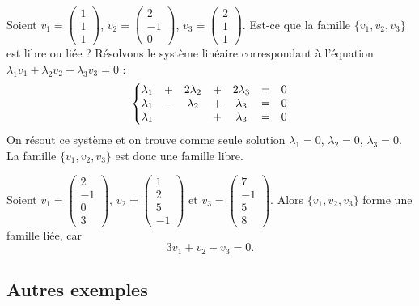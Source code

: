 \documentclass[class=report,crop=false]{standalone}
\begin{document}
\begin{exemple}
Soient
$v_1=\left(\begin{smallmatrix}  1\\1\\1 \end{smallmatrix}\right)$,
$v_2 = \left(\begin{smallmatrix} 2\\-1\\0 \end{smallmatrix}\right)$,
$v_3 = \left(\begin{smallmatrix} 2\\1\\1  \end{smallmatrix}\right)$.
Est-ce que la famille $\{v_1, v_2, v_3\}$ est libre ou liée ?
Résolvons le système linéaire correspondant à l'équation
$\lambda_1 v_1+ \lambda_2 v_2 + \lambda_3 v_3 = 0$ :
$$\left \{ \begin{matrix}
\lambda_1&+&2\lambda_2&+& 2\lambda_{3}&=&0 \cr
\lambda_1&-&\lambda_2&+&\lambda_{3}&=&0\cr
\lambda_1&&&+&\lambda_{3}&=&0\cr
\end{matrix}\right .$$
On résout ce système et on trouve comme seule solution
$\lambda_1=0$, $\lambda_2=0$, $\lambda_{3}=0$.
La famille $\{v_1, v_2, v_3\}$ est donc une famille libre.
\end{exemple}

\begin{exemple}
Soient $v_1=\left(\begin{smallmatrix}2\\ -1\\ 0\\3\end{smallmatrix}\right)$,
$v_2=\left(\begin{smallmatrix}1\\2\\5\\ -1\end{smallmatrix}\right)$ et
$v_3 = \left(\begin{smallmatrix}7\\ -1\\     5\\8\end{smallmatrix}\right)$.
Alors $\{v_1, v_2, v_3\}$ forme une famille liée, car
$$3v_1 + v_2 - v_3 = 0.$$
\end{exemple}

\subsection{Autres exemples}
\end{document}
